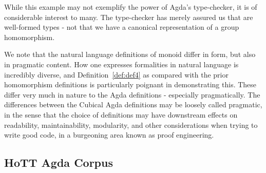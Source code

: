 While this example may not exemplify the power of Agda's type-checker, it is of
considerable interest to many. The type-checker has merely assured us that
 are well-formed types - not that we have a canonical representation
of a group homomorphism.

We note that the natural
language definitions of monoid differ in form, but also in pragmatic content.
How one expresses formalities in natural language is incredibly diverse, and
Definition~\ref{def:def4} as compared with the prior homomorphism definitions is
particularly poignant in demonstrating this. These differ very much in nature to
the Agda definitions - especially pragmatically.
The differences between the Cubical
Agda definitions may be loosely called pragmatic, in the sense that the choice
of definitions may have downstream effects on readability, maintainability, modularity, and other
considerations when trying to write good code, in a burgeoning area known as proof engineering.







\subsection{HoTT Agda Corpus} \label{hottproofs}


